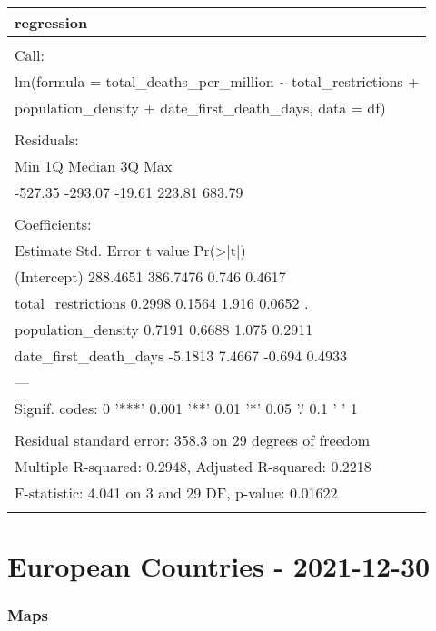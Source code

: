 \documentclass[
]{article}
\begin{document}
\begin{table}
\centering
\begin{tabular}[t]{l}
\hline
regression\\
\hline
\\
\hline
Call:\\
\hline
lm(formula = total\_deaths\_per\_million \textasciitilde{} total\_restrictions +\\
\hline
population\_density + date\_first\_death\_days, data = df)\\
\hline
\\
\hline
Residuals:\\
\hline
Min      1Q  Median      3Q     Max\\
\hline
-527.35 -293.07  -19.61  223.81  683.79\\
\hline
\\
\hline
Coefficients:\\
\hline
Estimate Std. Error t value Pr(>|t|)\\
\hline
(Intercept)           288.4651   386.7476   0.746   0.4617\\
\hline
total\_restrictions      0.2998     0.1564   1.916   0.0652 .\\
\hline
population\_density      0.7191     0.6688   1.075   0.2911\\
\hline
date\_first\_death\_days  -5.1813     7.4667  -0.694   0.4933\\
\hline
---\\
\hline
Signif. codes:  0 '***' 0.001 '**' 0.01 '*' 0.05 '.' 0.1 ' ' 1\\
\hline
\\
\hline
Residual standard error: 358.3 on 29 degrees of freedom\\
\hline
Multiple R-squared:  0.2948,    Adjusted R-squared:  0.2218\\
\hline
F-statistic: 4.041 on 3 and 29 DF,  p-value: 0.01622\\
\hline
\\
\hline
\end{tabular}
\end{table}

\hypertarget{european-countries---2021-12-30}{%
\section{\texorpdfstring{\textbf{European Countries -
2021-12-30}}{European Countries - 2021-12-30}}\label{european-countries---2021-12-30}}

\hypertarget{maps-1}{%
\subsubsection{Maps}\label{maps-1}}
\end{document}
